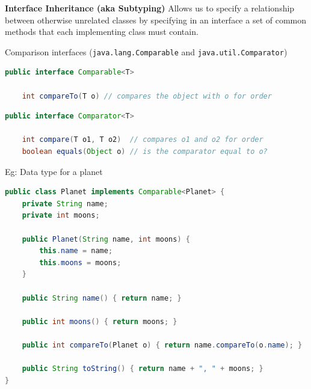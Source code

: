 \documentclass[8pt,a4paper,compress]{beamer}
\begin{document}
\begin{frame}[fragile]
\pause

\textbf{Interface Inheritance (aka Subtyping)} Allows us to specify a relationship between otherwise unrelated classes by specifying in
an interface a set of common methods that each implementing class must contain. 

\pause
\smallskip

Comparison interfaces (\lstinline$java.lang.Comparable$ and \lstinline$java.util.Comparator$)
\begin{lstlisting}[language=Java]
public interface Comparable<T>

    int compareTo(T o) // compares the object with o for order
\end{lstlisting}

\begin{lstlisting}[language=Java]
public interface Comparator<T>

    int compare(T o1, T o2)  // compares o1 and o2 for order
    boolean equals(Object o) // is the comparator equal to o? 
\end{lstlisting}

\pause

Eg: Data type for a planet

\begin{lstlisting}[language=Java]
public class Planet implements Comparable<Planet> {
    private String name;
    private int moons;

    public Planet(String name, int moons) {
        this.name = name;
        this.moons = moons;
    }
    
    public String name() { return name; }

    public int moons() { return moons; }

    public int compareTo(Planet o) { return name.compareTo(o.name); }
    
    public String toString() { return name + ", " + moons; }
}
\end{lstlisting}
\end{frame}
\end{document}
